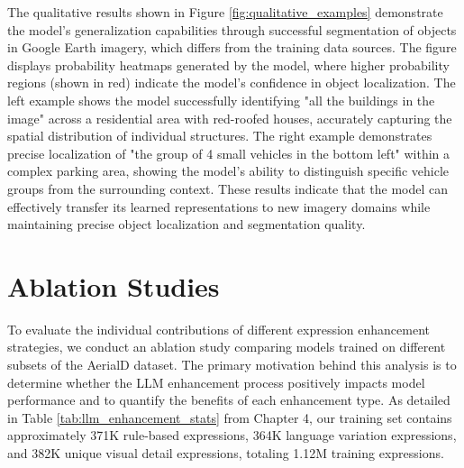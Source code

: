 The qualitative results shown in Figure \ref{fig:qualitative_examples} demonstrate the model's generalization capabilities through successful segmentation of objects in Google Earth imagery, which differs from the training data sources. The figure displays probability heatmaps generated by the model, where higher probability regions (shown in red) indicate the model's confidence in object localization. The left example shows the model successfully identifying "all the buildings in the image" across a residential area with red-roofed houses, accurately capturing the spatial distribution of individual structures. The right example demonstrates precise localization of "the group of 4 small vehicles in the bottom left" within a complex parking area, showing the model's ability to distinguish specific vehicle groups from the surrounding context. These results indicate that the model can effectively transfer its learned representations to new imagery domains while maintaining precise object localization and segmentation quality.

\section{Ablation Studies}

To evaluate the individual contributions of different expression enhancement strategies, we conduct an ablation study comparing models trained on different subsets of the AerialD dataset. The primary motivation behind this analysis is to determine whether the LLM enhancement process positively impacts model performance and to quantify the benefits of each enhancement type. As detailed in Table \ref{tab:llm_enhancement_stats} from Chapter 4, our training set contains approximately 371K rule-based expressions, 364K language variation expressions, and 382K unique visual detail expressions, totaling 1.12M training expressions.

